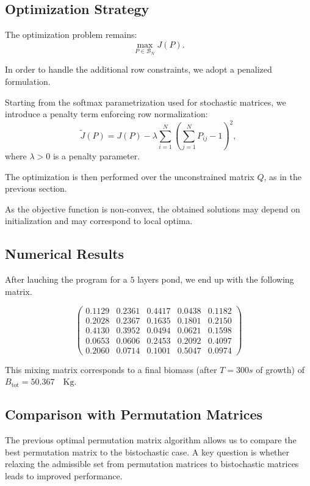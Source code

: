 \documentclass{article}
\begin{document}
\subsection{Optimization Strategy}

The optimization problem remains:
\[
\max_{P \in \mathcal{B}_N} J(P).
\]

In order to handle the additional row constraints, we adopt a penalized formulation.

Starting from the softmax parametrization used for stochastic matrices, 
we introduce a penalty term enforcing row normalization:
\[
\tilde{J}(P) = J(P) - \lambda \sum_{i=1}^{N} \left( \sum_{j=1}^{N} P_{ij} - 1 \right)^2,
\]
where $\lambda > 0$ is a penalty parameter.

The optimization is then performed over the unconstrained matrix $Q$, 
as in the previous section.

As the objective function is non-convex, the obtained solutions may depend on initialization and may correspond to local optima.

\subsection{Numerical Results}

After lauching the program for a $5$ layers pond, we end up with the following matrix.

\[
\begin{pmatrix}
0.1129 & 0.2361 & 0.4417 & 0.0438 & 0.1182 \\
0.2028 & 0.2367 & 0.1635 & 0.1801 & 0.2150 \\
0.4130 & 0.3952 & 0.0494 & 0.0621 & 0.1598 \\
0.0653 & 0.0606 & 0.2453 & 0.2092 & 0.4097 \\
0.2060 & 0.0714 & 0.1001 & 0.5047 & 0.0974
\end{pmatrix}
\]

This mixing matrix corresponds to a final biomass (after $T = 300s$ of growth) of $B_{\text{tot}} = 50.367 \quad \mathrm{Kg}$.

\subsection{Comparison with Permutation Matrices}

The previous optimal permutation matrix algorithm allows us to compare the best permutation matrix to the bistochastic case.
A key question is whether relaxing the admissible set from permutation matrices 
to bistochastic matrices leads to improved performance.
\end{document}
